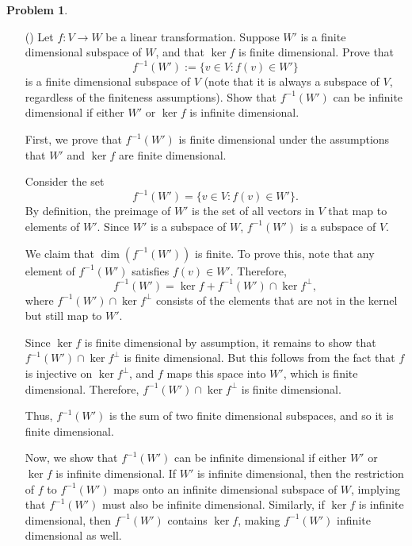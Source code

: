 \documentclass[12pt]{article}
\theoremstyle{definition}
\newtheorem{problem}{Problem}
\newcounter{subq}[problem]
\newenvironment{subproblem}
{\refstepcounter{subq} \begin{itemize} \item[(\alph{subq})]}
{\end{itemize} \medskip}
\begin{document}
\begin{problem}
    \phantom{a}
    \begin{subproblem}
        Let $f: V \rightarrow W$ be a linear transformation. Suppose $W'$ is a finite dimensional subspace of $W$, and that $\ker f$ is finite dimensional. Prove that
        \[
            f^{-1}(W') := \{v \in V : f(v) \in W'\}
        \]
        is a finite dimensional subspace of $V$ (note that it is always a subspace of $V$, regardless of the finiteness assumptions). Show that $f^{-1}(W')$ can be infinite dimensional if either
        $W'$ or $\ker f$ is infinite dimensional. 
        
        \begin{solution}
            First, we prove that $f^{-1}(W')$ is finite dimensional under the assumptions that $W'$ and $\ker f$ are finite dimensional.

            Consider the set 
            \[
            f^{-1}(W') = \{v \in V : f(v) \in W'\}.
            \]
            By definition, the preimage of $W'$ is the set of all vectors in $V$ that map to elements of $W'$. Since $W'$ is a subspace of $W$, $f^{-1}(W')$ is a subspace of $V$.

            We claim that $\dim(f^{-1}(W'))$ is finite. To prove this, note that any element of $f^{-1}(W')$ satisfies $f(v) \in W'$. Therefore, 
            \[
            f^{-1}(W') = \ker f + f^{-1}(W') \cap \ker f^\perp,
            \]
            where $f^{-1}(W') \cap \ker f^\perp$ consists of the elements that are not in the kernel but still map to $W'$.

            Since $\ker f$ is finite dimensional by assumption, it remains to show that $f^{-1}(W') \cap \ker f^\perp$ is finite dimensional. But this follows from the fact that $f$ is injective on $\ker f^\perp$, and $f$ maps this space into $W'$, which is finite dimensional. Therefore, $f^{-1}(W') \cap \ker f^\perp$ is finite dimensional.

            Thus, $f^{-1}(W')$ is the sum of two finite dimensional subspaces, and so it is finite dimensional.

            Now, we show that $f^{-1}(W')$ can be infinite dimensional if either $W'$ or $\ker f$ is infinite dimensional. If $W'$ is infinite dimensional, then the restriction of $f$ to $f^{-1}(W')$ maps onto an infinite dimensional subspace of $W$, implying that $f^{-1}(W')$ must also be infinite dimensional. Similarly, if $\ker f$ is infinite dimensional, then $f^{-1}(W')$ contains $\ker f$, making $f^{-1}(W')$ infinite dimensional as well.


\end{solution}
\end{subproblem}
\end{problem}
\end{document}
